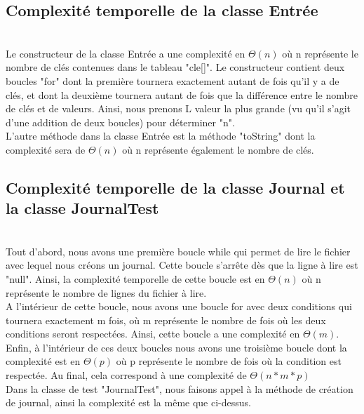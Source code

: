\documentclass[a4paper]{article}
\begin{document}
\subsection*{Complexité temporelle de la classe Entrée}
\\
Le constructeur de la classe Entrée a une complexité en $\Theta(n)$ où n représente le nombre de clés contenues dans le tableau "cle[]". Le constructeur contient deux boucles "for" dont la première tournera exactement autant de fois qu'il y a de clés, et dont la deuxième tournera autant de fois que la différence entre le nombre de clés et de valeurs. Ainsi, nous prenons L valeur la plus grande (vu qu'il s'agit d'une addition de deux boucles) pour déterminer "n". 
\\
L'autre méthode dans la classe Entrée est la méthode "toString" dont la complexité sera de $\Theta(n)$ où n représente également le nombre de clés. 
\\
\subsection*{Complexité temporelle de la classe Journal et la classe JournalTest}
\\
Tout d'abord, nous avons une première boucle while qui permet de lire le fichier avec lequel nous créons un journal. Cette boucle s'arrête dès que la ligne à lire est "null". Ainsi, la complexité temporelle de cette boucle est en $\Theta(n)$ où n représente le nombre de lignes du fichier à lire. 
\\
A l'intérieur de cette boucle, nous avons une boucle for avec deux conditions qui tournera exactement m fois, où m représente le nombre de fois où les deux conditions seront respectées. Ainsi, cette boucle a une complexité en $\Theta(m)$. 
\\
Enfin, à l'intérieur de ces deux boucles nous avons une troisième boucle dont la complexité est en $\Theta(p)$ où p représente le nombre de fois où la condition est respectée. 
Au final, cela correspond à une complexité de $\Theta(n*m*p)$
\\
Dans la classe de test "JournalTest", nous faisons appel à la méthode de création de journal, ainsi la complexité est la même que ci-dessus. 
\\
\end{document}
